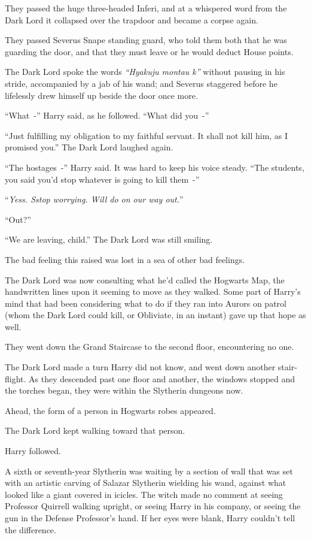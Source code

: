 They passed the huge three-headed Inferi, and at a whispered word from the Dark Lord it collapsed over the trapdoor and became a corpse again.

They passed Severus Snape standing guard, who told them both that he was guarding the door, and that they must leave or he would deduct House points.

The Dark Lord spoke the words \emph{``Hyakuju montau k''} without pausing in his stride, accompanied by a jab of his wand; and Severus staggered before he lifelessly drew himself up beside the door once more.

``What~-'' Harry said, as he followed. ``What did you~-''

``Just fulfilling my obligation to my faithful servant. It shall not kill him, as I promised you.'' The Dark Lord laughed again.

``The hostages~-'' Harry said. It was hard to keep his voice steady. ``The students, you said you'd stop whatever is going to kill them~-''

``\emph{Yess. Sstop worrying. Will do on our way out.}''

``Out?''

``We are leaving, child.'' The Dark Lord was still smiling.

The bad feeling this raised was lost in a sea of other bad feelings.

The Dark Lord was now consulting what he'd called the Hogwarts Map, the handwritten lines upon it seeming to move as they walked. Some part of Harry's mind that had been considering what to do if they ran into Aurors on patrol (whom the Dark Lord could kill, or Obliviate, in an instant) gave up that hope as well.

They went down the Grand Staircase to the second floor, encountering no one.

The Dark Lord made a turn Harry did not know, and went down another stair-flight. As they descended past one floor and another, the windows stopped and the torches began, they were within the Slytherin dungeons now.

Ahead, the form of a person in Hogwarts robes appeared.

The Dark Lord kept walking toward that person.

Harry followed.

A sixth or seventh-year Slytherin was waiting by a section of wall that was set with an artistic carving of Salazar Slytherin wielding his wand, against what looked like a giant covered in icicles. The witch made no comment at seeing Professor Quirrell walking upright, or seeing Harry in his company, or seeing the gun in the Defense Professor's hand. If her eyes were blank, Harry couldn't tell the difference.

